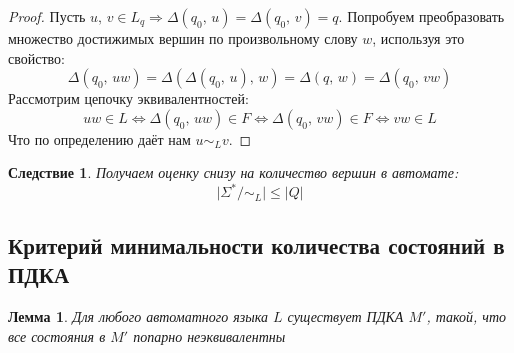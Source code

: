 \documentclass[a4paper,12pt]{article}
\renewcommand{\leq}{\ensuremath{\leqslant}}
\theoremstyle{plain}
\newtheorem{lemma}{Лемма}[subsection]
\newtheorem*{corollary}{Следствие}
\theoremstyle{definition}
\theoremstyle{remark}
\begin{document}
\begin{proof}
	Пусть $u,\, v \in L_q \Rightarrow \Delta(q_0,\, u) = \Delta(q_0,\, v) = q$. Попробуем преобразовать множество достижимых вершин по произвольному слову $w$, используя это свойство:
	\[
		\Delta(q_0,\, uw) = \Delta(\Delta(q_0,\, u),\, w) = \Delta(q,\, w) = \Delta(q_0,\, vw)
	\]
	Рассмотрим цепочку эквивалентностей:
	\[
		uw \in L \Leftrightarrow \Delta(q_0,\, uw) \in F \Leftrightarrow \Delta(q_0,\, vw) \in F \Leftrightarrow vw \in L
	\]
	Что по определению даёт нам $u \sim_L v$.
\end{proof}

\begin{corollary}
	Получаем оценку снизу на количество вершин в автомате:
	\[
		\vert\Sigma^*/\sim_L\vert \leq \vert Q\vert
	\]
\end{corollary}

\subsection{Критерий минимальности количества состояний в ПДКА}
\begin{lemma}
	Для любого автоматного языка $L$ существует ПДКА $M'$, такой, что все состояния в $M'$ попарно неэквивалентны
\end{lemma}
\end{document}
